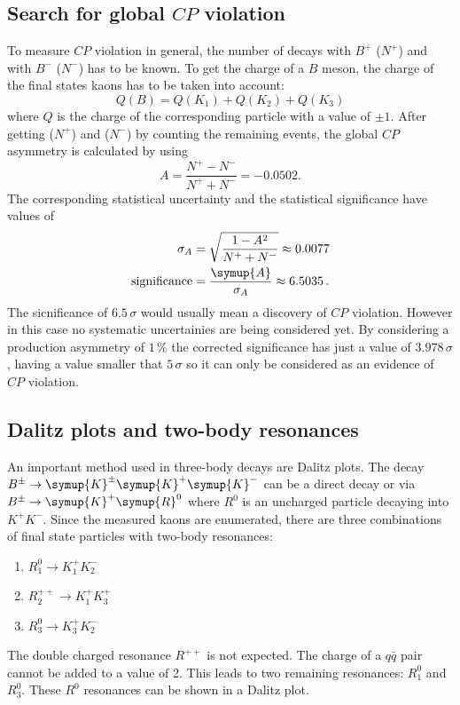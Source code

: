 \subsection{Search for global $C\!P$ violation}
To measure $C\!P$ violation in general, the number of decays with $B^+$ ($N^+$) and with $B^-$ ($N^-$) has to be known.
To get the charge of a $B$ meson, the charge of the final states kaons has to be taken into account:
\begin{equation}
  Q(B) = Q(K_1) + Q(K_2) + Q(K_3)
\end{equation}
where $Q$ is the charge of the corresponding particle with a value of $\pm 1$.
After getting ($N^+$) and ($N^-$) by counting the remaining events, the global $C\!P$ asymmetry is calculated by using
\begin{equation}
  A = \frac{N^+-N^-}{N^++N^-} = -0.0502. \label{eqn:ACP}
\end{equation}
The corresponding statistical uncertainty and the statistical significance have values of
\begin{align}
  \label{eqn:sigmaCP}
  \sigma_A &= \sqrt{\frac{1 - A^2}{N^{+} + N^{-}} } \approx 0.0077 \\
  \label{eqn:signifikanzCP}
  \text{significance} &= \frac{\symup{A}}{\sigma_A} \approx 6.5035 \, .
\end{align}
The sicnificance of $6.5\,\sigma$ would usually mean a discovery of $C\!P$ violation.
However in this case no systematic uncertainies are being considered yet.
By considering a production asymmetry of $1\,\%$ the corrected significance has just a value of $3.978\,\sigma$, having a value smaller that $5\,\sigma$ so it can only be considered as an evidence of $C\!P$ violation.

\subsection{Dalitz plots and two-body resonances}
An important method used in three-body decays are Dalitz plots.
The decay \mbox{$B^{\pm} \to \symup{K}^{\pm} \symup{K}^{+} \symup{K}^{-}$} can be a direct decay or via $B^{\pm} \to \symup{K}^{+} \symup{R}^{0}$ where $R^0$ is an uncharged particle decaying into $K^+ K^-$.
Since the measured kaons are enumerated, there are three combinations of final state particles with two-body resonances:
\begin{enumerate}
  \item $R^{0}_1 \to K_1^+ K_2^-$
  \item $R^{++}_2 \to K_1^+ K_3^+$
  \item $R^{0}_3 \to K_3^+ K_2^-$
\end{enumerate}
The double charged resonance $R^{++}$ is not expected.
The charge of a $q\bar{q}$ pair cannot be added to a value of 2.
This leads to two remaining resonances: $R^0_1$ and $R^0_3$.
These $R^0$ resonances can be shown in a Dalitz plot.

